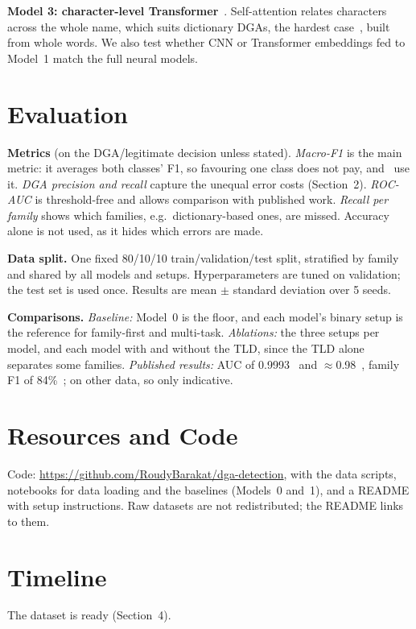 \documentclass[11pt]{article}
\begin{document}
\textbf{Model 3: character-level Transformer}~\cite{vaswani2017attention}.
Self-attention relates characters across the whole name, which suits dictionary
DGAs, the hardest case~\cite{torrealba2025deepdga}, built from whole words. We
also test whether CNN or Transformer embeddings fed to Model~1 match the full
neural models.

\section{Evaluation}
\textbf{Metrics} (on the DGA/legitimate decision unless stated).
\emph{Macro-F1} is the main metric: it averages both classes' F1, so favouring one
class does not pay, and~\citet{woodbridge2016lstm} use it. \emph{DGA precision and
recall} capture the unequal error costs (Section~2). \emph{ROC-AUC} is
threshold-free and allows comparison with published work. \emph{Recall per
family} shows which families, e.g.\ dictionary-based ones, are missed. Accuracy
alone is not used, as it hides which errors are made.

\textbf{Data split.} One fixed 80/10/10 train/validation/test split, stratified by
family and shared by all models and setups. Hyperparameters are tuned on
validation; the test set is used once. Results are mean $\pm$ standard deviation
over 5 seeds.

\textbf{Comparisons.} \emph{Baseline:} Model~0 is the floor, and each model's
binary setup is the reference for family-first and multi-task. \emph{Ablations:}
the three setups per model, and each model with and without the TLD, since the TLD
alone separates some families. \emph{Published results:} AUC of
0.9993~\cite{woodbridge2016lstm} and $\approx$0.98~\cite{shahzad2021dga}, family
F1 of 84\%~\cite{gregorio2024incremental}; on other data, so only indicative.

\section{Resources and Code}
Code: \url{https://github.com/RoudyBarakat/dga-detection}, with the data scripts,
notebooks for data loading and the baselines (Models~0 and~1), and a README with
setup instructions. Raw datasets are not redistributed; the README links to them.

\section{Timeline}
The dataset is ready (Section~4).
\end{document}

